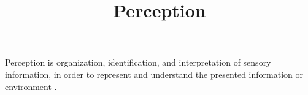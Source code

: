 \documentclass[a4paper]{article}
\title{Perception}
\date{}
\begin{document}
    \maketitle
    Perception is organization, identification, and interpretation of sensory information, in order to represent and understand the presented information or environment .
\end{document}

